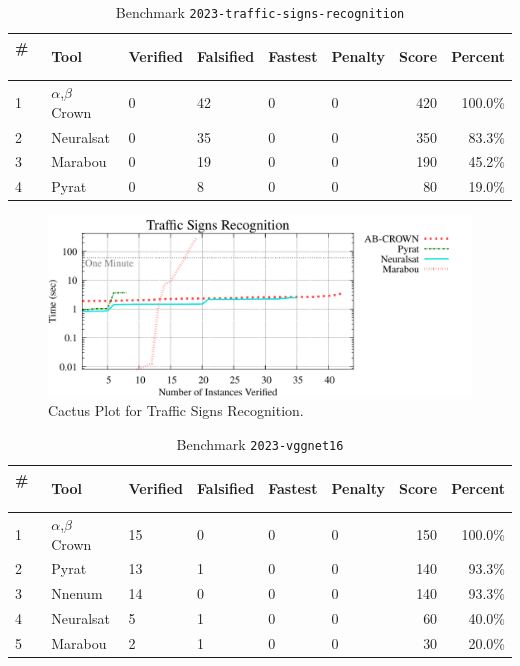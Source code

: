 \begin{table}[h]
\begin{center}
\caption{Benchmark \texttt{2023-traffic-signs-recognition}} \label{tab:cat_{cat}}
{\setlength{\tabcolsep}{2pt}
\begin{tabular}[h]{@{}llllllrr@{}}
\toprule
\textbf{\# ~} & \textbf{Tool} & \textbf{Verified} & \textbf{Falsified} & \textbf{Fastest} & \textbf{Penalty} & \textbf{Score} & \textbf{Percent}\\
\midrule
1 & $\alpha$,$\beta$ Crown & 0 & 42 & 0 & 0 & 420 & 100.0\% \\
2 & Neuralsat & 0 & 35 & 0 & 0 & 350 & 83.3\% \\
3 & Marabou & 0 & 19 & 0 & 0 & 190 & 45.2\% \\
4 & Pyrat & 0 & 8 & 0 & 0 & 80 & 19.0\% \\
\bottomrule
\end{tabular}
}
\end{center}
\end{table}



\begin{figure}[h]
\centerline{\includegraphics[width=\textwidth]{cactus/2023_traffic_signs_recognition.pdf}}
\caption{Cactus Plot for Traffic Signs Recognition.}
\label{fig:quantPic}
\end{figure}



\begin{table}[h]
\begin{center}
\caption{Benchmark \texttt{2023-vggnet16}} \label{tab:cat_{cat}}
{\setlength{\tabcolsep}{2pt}
\begin{tabular}[h]{@{}llllllrr@{}}
\toprule
\textbf{\# ~} & \textbf{Tool} & \textbf{Verified} & \textbf{Falsified} & \textbf{Fastest} & \textbf{Penalty} & \textbf{Score} & \textbf{Percent}\\
\midrule
1 & $\alpha$,$\beta$ Crown & 15 & 0 & 0 & 0 & 150 & 100.0\% \\
2 & Pyrat & 13 & 1 & 0 & 0 & 140 & 93.3\% \\
3 & Nnenum & 14 & 0 & 0 & 0 & 140 & 93.3\% \\
4 & Neuralsat & 5 & 1 & 0 & 0 & 60 & 40.0\% \\
5 & Marabou & 2 & 1 & 0 & 0 & 30 & 20.0\% \\
\bottomrule
\end{tabular}
}
\end{center}
\end{table}



